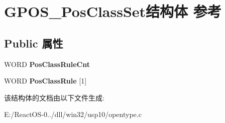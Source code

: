 \hypertarget{struct_g_p_o_s___pos_class_set}{}\section{G\+P\+O\+S\+\_\+\+Pos\+Class\+Set结构体 参考}
\label{struct_g_p_o_s___pos_class_set}
\subsection*{Public 属性}
\begin{DoxyCompactItemize}
\item 
\mbox{\label{struct_g_p_o_s___pos_class_set_a9a69d115981bd1cc665c941825c61125}} 
W\+O\+RD {\bfseries Pos\+Class\+Rule\+Cnt}
\item 
\mbox{\label{struct_g_p_o_s___pos_class_set_afbb5201a41ea14887f36cbc5a2c2f3b5}} 
W\+O\+RD {\bfseries Pos\+Class\+Rule} \mbox{[}1\mbox{]}
\end{DoxyCompactItemize}


该结构体的文档由以下文件生成\+:\begin{DoxyCompactItemize}
\item 
E\+:/\+React\+O\+S-\/0../dll/win32/usp10/opentype.\+c\end{DoxyCompactItemize}
